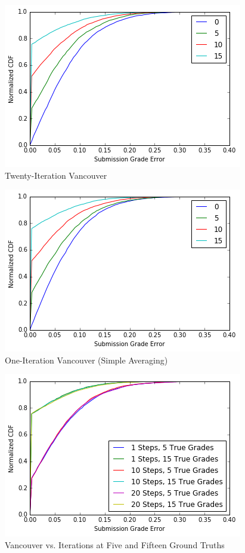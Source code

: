 \documentclass{article}
\begin{document}
	\begin{figure}[h]
		\includegraphics{vancouver-20-steps.png}
		\caption{Twenty-Iteration Vancouver}
		\label{fig:vancouver-20-steps}
	\end{figure}
	
	\begin{figure}[h]
		\includegraphics{vancouver-1-step.png}
		\caption{One-Iteration Vancouver (Simple Averaging)}
		\label{fig:vancouver-1-step}
	\end{figure}
	
	\begin{figure}[h]
		\includegraphics{vancouver-vs-iterations.png}
		\caption{Vancouver vs. Iterations at Five and Fifteen Ground Truths}
		\label{fig:vancouver-vs-iterations}
	\end{figure}
	
\end{document}
